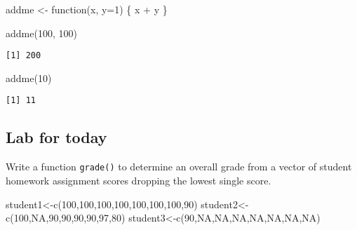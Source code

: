 \documentclass[
  letterpaper,
  DIV=11,
  numbers=noendperiod]{scrartcl}
\newenvironment{Shaded}{\begin{snugshade}}{\end{snugshade}}
\newcommand{\AttributeTok}[1]{\textcolor[rgb]{0.40,0.45,0.13}{#1}}
\newcommand{\ConstantTok}[1]{\textcolor[rgb]{0.56,0.35,0.01}{#1}}
\newcommand{\ControlFlowTok}[1]{\textcolor[rgb]{0.00,0.23,0.31}{#1}}
\newcommand{\DecValTok}[1]{\textcolor[rgb]{0.68,0.00,0.00}{#1}}
\newcommand{\FunctionTok}[1]{\textcolor[rgb]{0.28,0.35,0.67}{#1}}
\newcommand{\NormalTok}[1]{\textcolor[rgb]{0.00,0.23,0.31}{#1}}
\newcommand{\OtherTok}[1]{\textcolor[rgb]{0.00,0.23,0.31}{#1}}
\newcommand{\SpecialCharTok}[1]{\textcolor[rgb]{0.37,0.37,0.37}{#1}}
\begin{document}
\begin{Shaded}
\begin{Highlighting}[]
\NormalTok{addme }\OtherTok{\textless{}{-}} \ControlFlowTok{function}\NormalTok{(x, }\AttributeTok{y=}\DecValTok{1}\NormalTok{) \{}
\NormalTok{  x }\SpecialCharTok{+}\NormalTok{ y}
\NormalTok{\}}
\end{Highlighting}
\end{Shaded}

\begin{Shaded}
\begin{Highlighting}[]
\FunctionTok{addme}\NormalTok{(}\DecValTok{100}\NormalTok{, }\DecValTok{100}\NormalTok{)}
\end{Highlighting}
\end{Shaded}

\begin{verbatim}
[1] 200
\end{verbatim}

\begin{Shaded}
\begin{Highlighting}[]
\FunctionTok{addme}\NormalTok{(}\DecValTok{10}\NormalTok{)}
\end{Highlighting}
\end{Shaded}

\begin{verbatim}
[1] 11
\end{verbatim}

\hypertarget{lab-for-today}{%
\subsection{Lab for today}\label{lab-for-today}}

Write a function \texttt{grade()} to determine an overall grade from a
vector of student homework assignment scores dropping the lowest single
score.

\begin{Shaded}
\begin{Highlighting}[]
\NormalTok{student1}\OtherTok{\textless{}{-}}\FunctionTok{c}\NormalTok{(}\DecValTok{100}\NormalTok{,}\DecValTok{100}\NormalTok{,}\DecValTok{100}\NormalTok{,}\DecValTok{100}\NormalTok{,}\DecValTok{100}\NormalTok{,}\DecValTok{100}\NormalTok{,}\DecValTok{100}\NormalTok{,}\DecValTok{90}\NormalTok{)}
\NormalTok{student2}\OtherTok{\textless{}{-}}\FunctionTok{c}\NormalTok{(}\DecValTok{100}\NormalTok{,}\ConstantTok{NA}\NormalTok{,}\DecValTok{90}\NormalTok{,}\DecValTok{90}\NormalTok{,}\DecValTok{90}\NormalTok{,}\DecValTok{90}\NormalTok{,}\DecValTok{97}\NormalTok{,}\DecValTok{80}\NormalTok{) }
\NormalTok{student3}\OtherTok{\textless{}{-}}\FunctionTok{c}\NormalTok{(}\DecValTok{90}\NormalTok{,}\ConstantTok{NA}\NormalTok{,}\ConstantTok{NA}\NormalTok{,}\ConstantTok{NA}\NormalTok{,}\ConstantTok{NA}\NormalTok{,}\ConstantTok{NA}\NormalTok{,}\ConstantTok{NA}\NormalTok{,}\ConstantTok{NA}\NormalTok{)}
\end{Highlighting}
\end{Shaded}
\end{document}
